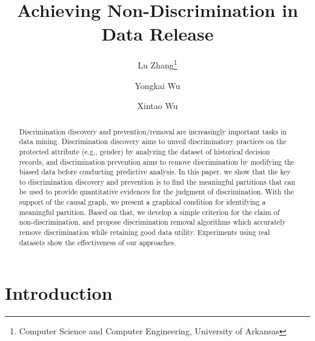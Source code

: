\documentclass[twoside,leqno,twocolumn]{article}
\begin{document}
\renewcommand{\algorithmicrequire}{\textbf{Input:}}
\renewcommand{\algorithmicensure}{\textbf{Output:}}


\title{\Large Achieving Non-Discrimination in Data Release}
\author{Lu Zhang\thanks{Computer Science and Computer Engineering, University of Arkansas} \\
\and
Yongkai Wu\footnotemark[1] \\
\and
Xintao Wu\footnotemark[1]}
\date{}

\maketitle



\begin{abstract} \small\baselineskip=9pt 
Discrimination discovery and prevention/removal are increasingly important tasks in data mining. Discrimination discovery aims to unveil discriminatory practices on the protected attribute (e.g., gender) by analyzing the dataset of historical decision records, and discrimination prevention aims to remove discrimination by modifying the biased data before conducting predictive analysis. In this paper, we show that the key to discrimination discovery and prevention is to find the meaningful partitions that can be used to provide quantitative evidences for the judgment of discrimination. With the support of the causal graph, we present a graphical condition for identifying a meaningful partition. Based on that, we develop a simple criterion for the claim of non-discrimination, and propose discrimination removal algorithms which accurately remove discrimination while retaining good data utility. Experiments using real datasets show the effectiveness of our approaches.
\end{abstract}



\section{Introduction}\label{sec:intro}
\end{document}
